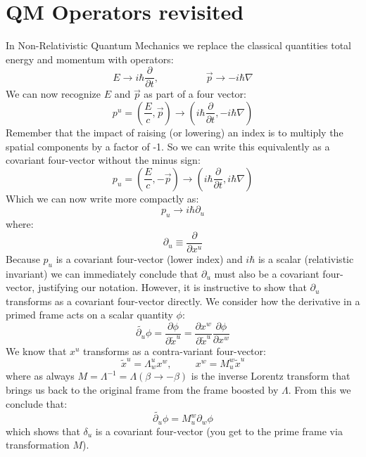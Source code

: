 \documentclass[12pt]{book}
\begin{document}
\section{QM Operators revisited}
In Non-Relativistic Quantum Mechanics we replace the classical quantities total energy and momentum with operators:
$$E \to i\hbar \frac{\partial}{\partial t}, \hspace{2cm}
\vec{p} \to -i\hbar \nabla
$$
We can now recognize $E$ and $\vec{p}$ as part of a four vector:
$$p^u = \left( \frac{E}{c}, \vec{p}\right) \to \left( i\hbar \frac{\partial}{\partial t},
-i\hbar \nabla \right)$$
Remember that the impact of raising (or lowering) an index is to multiply the spatial components by a factor of -1.  So we can write this equivalently as a covariant four-vector without the minus sign:
$$p_u = \left( \frac{E}{c}, -\vec{p}\right) \to \left( i\hbar \frac{\partial}{\partial t},
i\hbar \nabla \right)$$
Which we can now write more compactly as:
$$p_u \to i \hbar \partial_u$$
where:
$$\partial_u \equiv \frac{\partial}{\partial x^u}$$
Because $p_u$ is a covariant four-vector (lower index) and $i \hbar$ is a scalar (relativistic invariant) we can immediately conclude that $\partial_u$ must also be a covariant four-vector, justifying our notation.  However, it is instructive to show that $\partial_u$ transforms as a covariant four-vector directly.  We consider how the derivative in a primed frame acts on a scalar quantity $\phi$:
$$\widetilde{\partial_u} \phi = \frac{\partial \phi}{\partial \widetilde{x}^u} = 
\frac{\partial x^w}{\partial \widetilde{x}^u} \frac{\partial \phi}{\partial x^w}
$$
We know that $x^u$ transforms as a contra-variant four-vector:
$$\widetilde{x}^u = \Lambda^u_w x^w, \hspace{1cm} x^w = M^w_u \widetilde{x}^u$$
where as always $M = \Lambda^{-1} = \Lambda(\beta \to -\beta)$ is the inverse Lorentz transform that brings us back to the original frame from the frame boosted by $\Lambda$.
From this we conclude that:
$$\widetilde{\partial_u} \phi = M^w_u \partial_w \phi$$ 
which shows that $\delta_u$ is a covariant four-vector (you get to the prime frame via transformation $M$).
\end{document}
